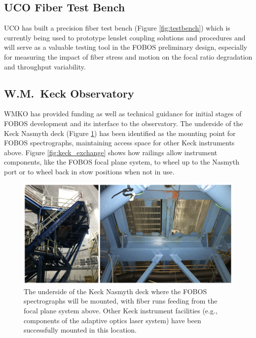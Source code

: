 \documentclass[oneside,11pt]{amsart}
\begin{document}
\subsection{UCO Fiber Test Bench}

UCO has built a precision fiber test bench (Figure \ref{fig:testbench}) which is currently being used to prototype lenslet coupling solutions and procedures and will serve as a valuable testing tool in the FOBOS preliminary design, especially for measuring the impact of fiber stress and motion on the focal ratio degradation and throughput variability.

\subsection{W.M.\ Keck Observatory}

WMKO has provided funding as well as technical guidance for initial stages of FOBOS development and its interface to the observatory.  The underside of the Keck Nasmyth deck (Figure \ref{fig:nasmyth_mount}) has been identified as the mounting point for FOBOS spectrographs, maintaining access space for other Keck instruments above.  Figure \ref{fig:keck_exchange} shows how railings allow instrument components, like the FOBOS focal plane system, to wheel up to the Nasmyth port or to wheel back in stow positions when not in use.


\begin{figure}[h!]
 \vskip -0.1in
 \includegraphics[width=\textwidth]{figs/nasmyth_deck.png}
 \caption{\small The underside of the Keck Nasmyth deck where the FOBOS spectrographs will be mounted, with fiber runs feeding from the focal plane system above.  Other Keck instrument facilities (e.g., components of the adaptive optics laser system) have been successfully mounted in this location.  }\label{fig:nasmyth_mount}
\end{figure}
\end{document}
